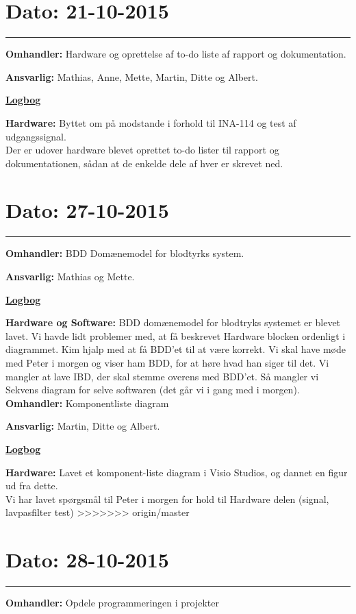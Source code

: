 \section{Dato: 21-10-2015}
\hrule
\textbf{Omhandler:} Hardware og oprettelse af to-do liste af rapport og dokumentation.

\textbf{Ansvarlig:} Mathias, Anne, Mette, Martin, Ditte og Albert.

\underline{\textbf{Logbog}}

\textbf{Hardware: }Byttet om på modstande i forhold til INA-114 og test af udgangssignal. 
\\
Der er udover hardware blevet oprettet to-do lister til rapport og dokumentationen, sådan at de enkelde dele af hver er skrevet ned.

\section{Dato: 27-10-2015}
\hrule
\textbf{Omhandler:} BDD Domænemodel for blodtyrks system. 

\textbf{Ansvarlig:} Mathias og Mette.

\underline{\textbf{Logbog}}

\textbf{Hardware og Software: } BDD domænemodel for blodtryks systemet er blevet lavet. Vi havde lidt problemer med, at få beskrevet Hardware blocken ordenligt i diagrammet. Kim hjalp med at få BDD'et til at være korrekt. Vi skal have møde med Peter i morgen og viser ham BDD, for at høre hvad han siger til det. 
Vi mangler at lave IBD, der skal stemme overens med BDD'et. Så mangler vi Sekvens diagram for selve softwaren (det går vi i gang med i morgen).
\\

\textbf{Omhandler:} Komponentliste diagram

\textbf{Ansvarlig:} Martin, Ditte og Albert.

\underline{\textbf{Logbog}}

\textbf{Hardware: } Lavet et komponent-liste diagram i Visio Studios, og dannet en figur ud fra dette. 
\\
Vi har lavet spørgsmål til Peter i morgen for hold til Hardware delen (signal, lavpasfilter test)
>>>>>>> origin/master

\section{Dato: 28-10-2015}
\hrule
\textbf{Omhandler:} Opdele programmeringen i projekter

